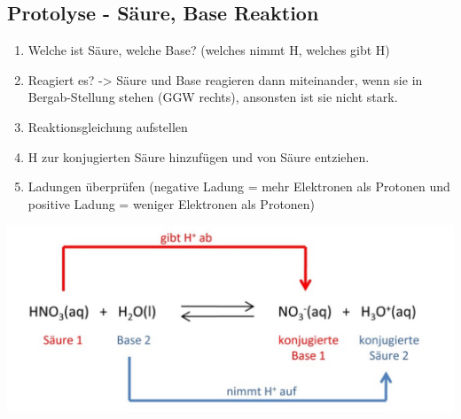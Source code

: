 \subsection{Protolyse - Säure, Base Reaktion}
\begin{enumerate}
	\item Welche ist Säure, welche Base? (welches nimmt H, welches gibt H)
	\item Reagiert es? -> Säure und Base reagieren dann miteinander, wenn sie in Bergab-Stellung stehen (GGW rechts), ansonsten ist sie nicht stark.
	\item Reaktionsgleichung aufstellen
	\item H zur konjugierten Säure hinzufügen und von Säure entziehen.
	\item Ladungen überprüfen (negative Ladung = mehr Elektronen als Protonen und positive Ladung = weniger Elektronen als Protonen)
\end{enumerate}

\begin{center}
\includegraphics[scale=0.2]{images/Saure_Base_ex.png}
\end{center}
